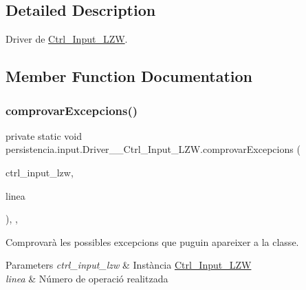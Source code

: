\subsection{Detailed Description}
Driver de \hyperlink{classpersistencia_1_1input_1_1Ctrl__Input__LZW}{Ctrl\+\_\+\+Input\+\_\+\+L\+ZW}. 

\subsection{Member Function Documentation}
\mbox{\label{classpersistencia_1_1input_1_1Driver____Ctrl__Input__LZW_a86e186fca84cfae1f5a019b4853a0902}} 
\subsubsection{\texorpdfstring{comprovar\+Excepcions()}{comprovarExcepcions()}}
{\footnotesize\ttfamily private static void persistencia.\+input.\+Driver\+\_\+\+\_\+\+Ctrl\+\_\+\+Input\+\_\+\+L\+Z\+W.\+comprovar\+Excepcions (\begin{DoxyParamCaption}\item[{\hyperlink{classpersistencia_1_1input_1_1Ctrl__Input__LZW}{Ctrl\+\_\+\+Input\+\_\+\+L\+ZW}}]{ctrl\+\_\+input\+\_\+lzw,  }\item[{String}]{linea }\end{DoxyParamCaption})\hspace{0.3cm}{\ttfamily [inline]}, {\ttfamily [static]}, {\ttfamily [private]}}



Comprovarà les possibles excepcions que puguin apareixer a la classe. 


\begin{DoxyParams}{Parameters}
{\em ctrl\+\_\+input\+\_\+lzw} & Instància \hyperlink{classpersistencia_1_1input_1_1Ctrl__Input__LZW}{Ctrl\+\_\+\+Input\+\_\+\+L\+ZW} \\
\hline
{\em linea} & Número de operació realitzada \\
\hline
\end{DoxyParams}


